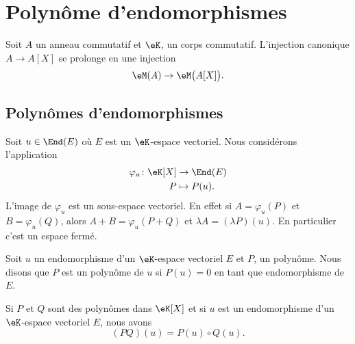 
\section{Polynôme d'endomorphismes}

Soit \( A\) un anneau commutatif et \( \eK\), un corps commutatif. L'injection canonique \( A\to A[X]\) se prolonge en une injection
\begin{equation}
   \eM(A)\to\eM\big( A[X] \big).
\end{equation}

\subsection{Polynômes d'endomorphismes}

Soit \( u\in\End(E)\) où \( E\) est un \( \eK\)-espace vectoriel. Nous considérons l'application
\begin{equation}    \label{EqOVKooeMJuv}
    \begin{aligned}
        \varphi_u\colon \eK[X]&\to \End(E) \\
        P&\mapsto P(u). 
    \end{aligned}
\end{equation}
L'image de \( \varphi_u\) est un sous-espace vectoriel. En effet si \( A=\varphi_u(P)\) et \( B=\varphi_u(Q)\), alors \( A+B=\varphi_u(P+Q)\) et \( \lambda A=(\lambda P)(u)\). En particulier c'est un espace fermé.

Soit \( u\) un endomorphisme d'un \( \eK\)-espace vectoriel \( E\) et \( P\), un polynôme. Nous disons que \( P\) est un polynôme  de \( u\) si \( P(u)=0\) en tant que endomorphisme de \( E\).

\begin{lemma}       \label{LemQWvhYb}
    Si \( P\) et \( Q\) sont des polynômes dans \( \eK[X]\) et si \( u\) est un endomorphisme d'un \( \eK\)-espace vectoriel \( E\), nous avons
    \begin{equation}
        (PQ)(u)=P(u)\circ Q(u).
    \end{equation}
\end{lemma}


